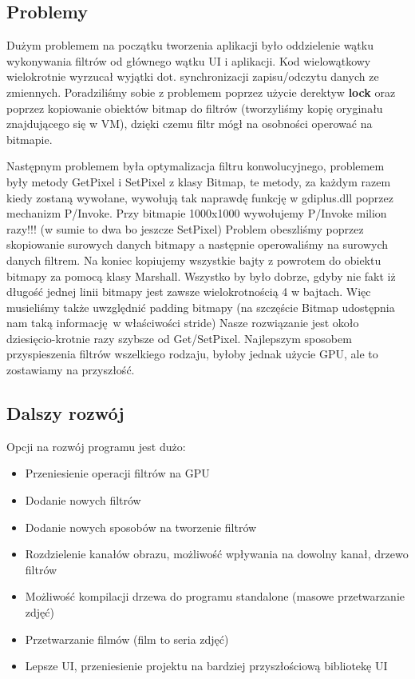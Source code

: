 \documentclass{article}
\begin{document}
\subsection{Problemy}
Dużym problemem na początku tworzenia aplikacji było oddzielenie wątku wykonywania filtrów od głównego wątku UI i aplikacji.
Kod wielowątkowy wielokrotnie wyrzucał wyjątki dot. synchronizacji zapisu/odczytu danych ze zmiennych.
Poradziliśmy sobie z problemem poprzez użycie derektyw \textbf{lock} oraz poprzez kopiowanie obiektów bitmap do filtrów 
(tworzyliśmy kopię oryginału znajdującego się w VM), dzięki czemu filtr mógł na osobności operować na bitmapie.

Następnym problemem była optymalizacja filtru konwolucyjnego, problemem były metody GetPixel i SetPixel z klasy Bitmap,
te metody, za każdym razem kiedy zostaną wywołane, wywołują tak naprawdę funkcję w gdiplus.dll poprzez mechanizm P/Invoke.
Przy bitmapie 1000x1000 wywołujemy P/Invoke milion razy!!! (w sumie to dwa bo jeszcze SetPixel)
Problem obeszliśmy poprzez skopiowanie surowych danych bitmapy a następnie operowaliśmy na surowych danych filtrem.
Na koniec kopiujemy wszystkie bajty z powrotem do obiektu bitmapy za pomocą klasy Marshall.
Wszystko by było dobrze, gdyby nie fakt iż długość jednej linii bitmapy jest zawsze wielokrotnością 4 w bajtach.
Więc musieliśmy także uwzględnić padding bitmapy (na szczęście Bitmap udostępnia nam taką informację w właściwości stride)
Nasze rozwiązanie jest około dziesięcio-krotnie razy szybsze od Get/SetPixel.
Najlepszym sposobem przyspieszenia filtrów wszelkiego rodzaju, byłoby jednak użycie
GPU, ale to zostawiamy na przyszłość.



\subsection{Dalszy rozwój}
Opcji na rozwój programu jest dużo:
\begin{itemize}
    \item Przeniesienie operacji filtrów na GPU 
    \item Dodanie nowych filtrów
    \item Dodanie nowych sposobów na tworzenie filtrów
    \item Rozdzielenie kanałów obrazu, możliwość wpływania na dowolny kanał, drzewo filtrów
    \item Możliwość kompilacji drzewa do programu standalone (masowe przetwarzanie zdjęć)
    \item Przetwarzanie filmów (film to seria zdjęć)
    \item Lepsze UI, przeniesienie projektu na bardziej przyszłościową bibliotekę UI
\end{itemize}
\end{document}

